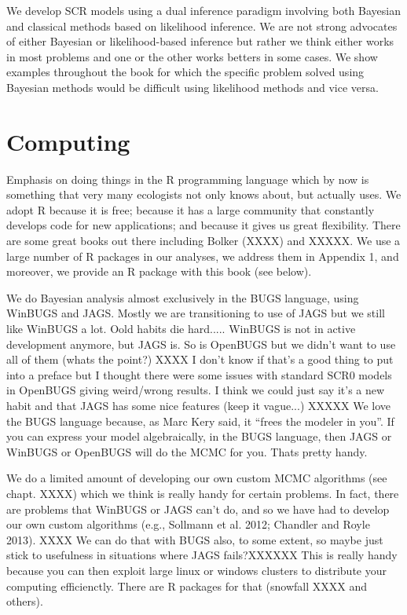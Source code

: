 We develop SCR models using a dual inference paradigm involving both
Bayesian and classical methods based on likelihood inference.
We are not strong advocates of either Bayesian or likelihood-based
inference but rather we think either works in most problems and one or
the other works betters in some cases. 
We show examples throughout the
book for which the specific problem solved using Bayesian methods
would be difficult using likelihood methods and vice versa.


\section*{Computing}

Emphasis on doing things in the 
R programming language which by now is something that very many
ecologists not only knows about, but actually uses. We adopt R because it is free; because it has a large community that constantly develops code for new applications; and because it gives us great flexibility.
  There are some
great books out there including Bolker (XXXX) and XXXXX. We use a
large number of R packages in our analyses, we address them in
Appendix 1, and moreover, we provide an R package with this book (see below).

We do Bayesian analysis almost exclusively in the BUGS language, using
WinBUGS and JAGS. Mostly we are transitioning to use of JAGS but we
still like WinBUGS a lot. Oold habits die hard..... WinBUGS is not in
active development anymore, but JAGS is. So is OpenBUGS but we didn't
want to use all of them (whats the point?) 
XXXX I don't know if that's a good thing to put into a preface but I thought there were some issues with standard SCR0 models in OpenBUGS giving weird/wrong results. I think we could just say it's a new habit and that JAGS has some nice features (keep it vague...) XXXXX
 We love the BUGS language
because, as Marc Kery said, it ``frees the modeler in you''.
If you can express your model algebraically, in the BUGS language,
then JAGS or WinBUGS or OpenBUGS will do the MCMC for you. Thats
pretty handy.

We do a limited amount of developing our own custom MCMC algorithms
(see chapt. XXXX) which we think is really handy for certain
problems. In fact, there are problems that WinBUGS or JAGS can't do,
and so we have had to develop our own custom algorithms (e.g.,
Sollmann et al. 2012; Chandler and Royle 2013). 
XXXX We can do that with BUGS also, to some extent, so maybe just stick to usefulness in situations where JAGS fails?XXXXXX
This is really handy
because you can then exploit large linux or windows clusters to
distribute your computing efficienctly. There are R packages for that
(snowfall XXXX and others). 

